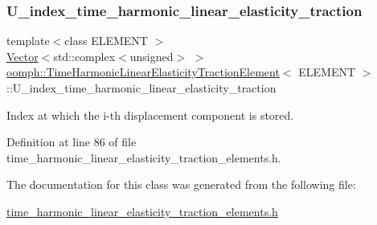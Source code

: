 \subsubsection{\texorpdfstring{U\+\_\+index\+\_\+time\+\_\+harmonic\+\_\+linear\+\_\+elasticity\+\_\+traction}{U\_index\_time\_harmonic\_linear\_elasticity\_traction}}
{\footnotesize\ttfamily template$<$class E\+L\+E\+M\+E\+NT $>$ \\
\hyperlink{classoomph_1_1Vector}{Vector}$<$std\+::complex$<$unsigned$>$ $>$ \hyperlink{classoomph_1_1TimeHarmonicLinearElasticityTractionElement}{oomph\+::\+Time\+Harmonic\+Linear\+Elasticity\+Traction\+Element}$<$ E\+L\+E\+M\+E\+NT $>$\+::U\+\_\+index\+\_\+time\+\_\+harmonic\+\_\+linear\+\_\+elasticity\+\_\+traction\hspace{0.3cm}{\ttfamily [protected]}}



Index at which the i-\/th displacement component is stored. 



Definition at line 86 of file time\+\_\+harmonic\+\_\+linear\+\_\+elasticity\+\_\+traction\+\_\+elements.\+h.



The documentation for this class was generated from the following file\+:\begin{DoxyCompactItemize}
\item 
\hyperlink{time__harmonic__linear__elasticity__traction__elements_8h}{time\+\_\+harmonic\+\_\+linear\+\_\+elasticity\+\_\+traction\+\_\+elements.\+h}\end{DoxyCompactItemize}

